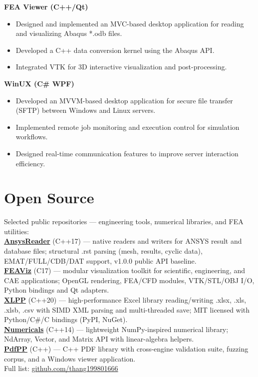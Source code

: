 \documentclass[a4paper,10pt]{article}
\begin{document}
\textbf{FEA Viewer (C++/Qt)}

\begin{itemize}[leftmargin=*]
    \item Designed and implemented an MVC-based desktop application for reading and visualizing Abaqus *.odb files.
    \item Developed a C++ data conversion kernel using the Abaqus API.
    \item Integrated VTK for 3D interactive visualization and post-processing.
\end{itemize}

\textbf{WinUX (C\# WPF)}

\begin{itemize}[leftmargin=*]
    \item Developed an MVVM-based desktop application for secure file transfer (SFTP) between Windows and Linux servers.
    \item Implemented remote job monitoring and execution control for simulation workflows.
    \item Designed real-time communication features to improve server interaction efficiency.
\end{itemize}

\section*{Open Source}

Selected public repositories --- engineering tools, numerical libraries, and FEA utilities: \\[0.2cm]
\textbf{\href{https://github.com/thang199801666/AnsysReader}{AnsysReader}} (C++17) ---
native readers and writers for ANSYS result and database files; structural .rst parsing (mesh, results, cyclic data), EMAT/FULL/CDB/DAT support, v1.0.0 public API baseline. \\[0.15cm]
\textbf{\href{https://github.com/thang199801666/FEAViz}{FEAViz}} (C17) ---
modular visualization toolkit for scientific, engineering, and CAE applications; OpenGL rendering, FEA/CFD modules, VTK/STL/OBJ I/O, Python bindings and Qt adapters. \\[0.15cm]
\textbf{\href{https://github.com/thang199801666/XLPP}{XLPP}} (C++20) ---
high-performance Excel library reading/writing .xlsx, .xls, .xlsb, .csv with SIMD XML parsing and multi-threaded save; MIT licensed with Python/C\#/C bindings (PyPI, NuGet). \\[0.15cm]
\textbf{\href{https://github.com/thang199801666/Numericals}{Numericals}} (C++14) ---
lightweight NumPy-inspired numerical library; NdArray, Vector, and Matrix API with linear-algebra helpers. \\[0.15cm]
\textbf{\href{https://github.com/thang199801666/PdfPP}{PdfPP}} (C++) ---
C++ PDF library with cross-engine validation suite, fuzzing corpus, and a Windows viewer application. \\
Full list: \href{https://github.com/thang199801666?tab=repositories}{github.com/thang199801666}
\end{document}
